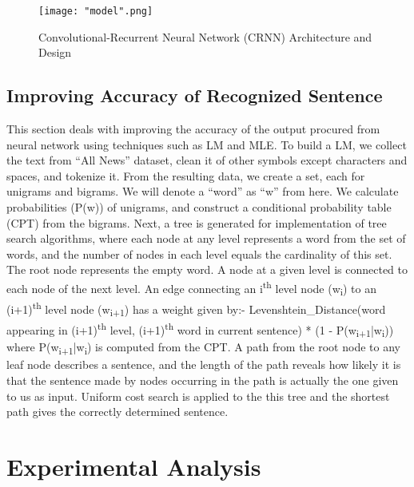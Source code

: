 \documentclass[a4paper, 10pt,twocolumn]{article}
\begin{document}
\begin{figure}[h]
\centering
\texttt{[image: "model".png]}
\caption{Convolutional-Recurrent Neural Network (CRNN) Architecture and Design}
\end{figure}

\subsection*{Improving Accuracy of Recognized Sentence}

This section deals with improving the accuracy of the output procured from neural network using techniques such as LM and MLE. To build a LM, we collect the text from \enquote{All News} dataset, clean it of other symbols except characters and spaces, and tokenize it. From the resulting data, we create a set, each for unigrams and bigrams. We will denote a \enquote{word} as \enquote{w} from here. We calculate probabilities (P(w)) of unigrams, and construct a conditional probability table (CPT) from the bigrams. Next, a tree is generated for implementation of tree search algorithms, where each node at any level represents a word from the set of words, and the number of nodes in each level equals the cardinality of this set. The root node represents the empty word. A node at a given level is connected to each node of the next level. An edge connecting an i\textsuperscript{th} level node (w\textsubscript{i}) to an (i+1)\textsuperscript{th} level node (w\textsubscript{i+1}) has a weight given by:- \newline \newline Levenshtein\_Distance(word appearing in (i+1)\textsuperscript{th} level, (i+1)\textsuperscript{th} word in current sentence) * (1 - P(w\textsubscript{i+1}|w\textsubscript{i})) \newline \newline where P(w\textsubscript{i+1}|w\textsubscript{i}) is computed from the CPT. A path from the root node to any leaf node describes a sentence, and the length of the path reveals how likely it is that the sentence made by nodes occurring in the path is actually the one given to us as input. Uniform cost search is applied to the this tree and the shortest path gives the correctly determined sentence.

\section{Experimental Analysis} 
\end{document}
